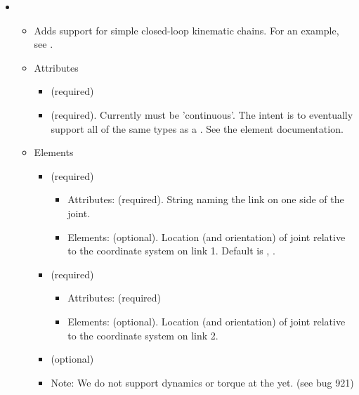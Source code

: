 \begin{itemize}
\item {}
\begin{itemize}
\item Adds support for simple closed-loop kinematic chains.  For an example, see .  
\item Attributes
\begin{itemize}
\item {} (required)
\item {} (required). Currently must be 'continuous'.  The intent is to eventually support all of the same types as a . See the  element documentation. 
\end{itemize}
\item Elements
\begin{itemize}
\item {} (required)
\begin{itemize}
\item Attributes:  (required). String naming the link on one side of the joint.
\item Elements:  (optional). Location (and orientation) of joint relative to the coordinate system on link 1. Default is , . 
\end{itemize}
\item {} (required)
\begin{itemize}
\item Attributes:  (required)
\item Elements:  (optional). Location (and orientation) of joint relative to the coordinate system on link 2. 
\end{itemize}
\item {} (optional) 
\item Note: We do not support dynamics or torque at the  yet. (see bug 921) 
\end{itemize}
\end{itemize}


\end{itemize}
